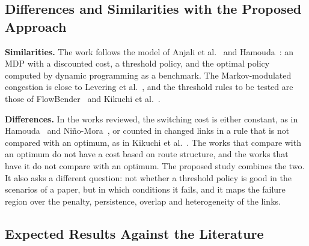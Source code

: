 \documentclass[11pt,a4paper]{article}
\begin{document}
\subsection{Differences and Similarities with the Proposed Approach}

\textbf{Similarities.} The work follows the model of Anjali et al.~\cite{anjali2002} and Hamouda~\cite{hamouda2020}: an MDP with a discounted cost, a threshold policy, and the optimal policy computed by dynamic programming as a benchmark. The Markov-modulated congestion is close to Levering et al.~\cite{levering2022}, and the threshold rules to be tested are those of FlowBender~\cite{kabbani2014} and Kikuchi et al.~\cite{kikuchi2025}.

\textbf{Differences.} In the works reviewed, the switching cost is either constant, as in Hamouda~\cite{hamouda2020} and Ni\~no-Mora~\cite{ninomora2008}, or counted in changed links in a rule that is not compared with an optimum, as in Kikuchi et al.~\cite{kikuchi2025}. The works that compare with an optimum do not have a cost based on route structure, and the works that have it do not compare with an optimum. The proposed study combines the two. It also asks a different question: not whether a threshold policy is good in the scenarios of a paper, but in which conditions it fails, and it maps the failure region over the penalty, persistence, overlap and heterogeneity of the links.

\subsection{Expected Results Against the Literature}
\end{document}
